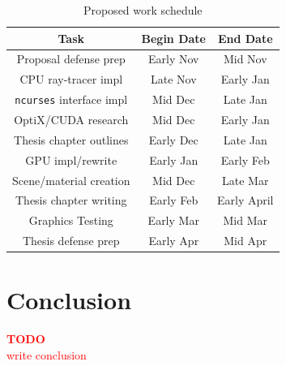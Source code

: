 \documentclass[11pt]{article}
\newcommand\todo[1]{
\begin{center}
  \textcolor{red}{\bf TODO}\\
  \textcolor{red}{#1}
\end{center}
}
\begin{document}
\begin{table}[htbp]
  \vspace*{0.6em}
  \centering
  \begin{tabular}{|c||c|c|}
    \hline
    \textbf{Task} & \textbf{Begin Date} & \textbf{End Date} \\\hline\hline
    Proposal defense prep & Early Nov & Mid Nov \\\hline
    CPU ray-tracer impl & Late Nov & Early Jan \\\hline
    \texttt{ncurses} interface impl & Mid Dec & Late Jan \\\hline
    OptiX/CUDA research & Mid Dec & Early Jan \\\hline
    Thesis chapter outlines & Early Dec & Late Jan \\\hline
    GPU impl/rewrite & Early Jan & Early Feb \\\hline
    Scene/material creation & Mid Dec & Late Mar \\\hline
    Thesis chapter writing & Early Feb & Early April \\\hline
    Graphics Testing & Early Mar & Mid Mar \\\hline
    Thesis defense prep & Early Apr & Mid Apr \\\hline
  \end{tabular}
  \caption{Proposed work schedule}
  \label{worktable}
\end{table}

\section{Conclusion}
\label{sec:conclusion}


\todo{write conclusion}




\end{document}
